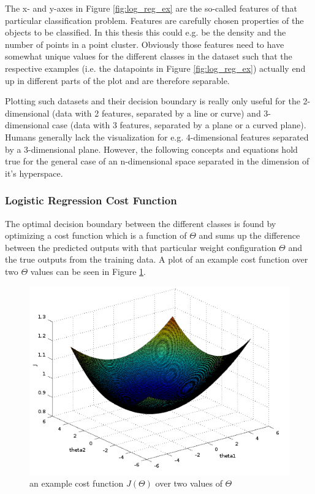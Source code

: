 The x- and y-axes in Figure \ref{fig:log_reg_ex} are the so-called features of that particular classification problem. Features are carefully chosen properties of the objects to be classified. In this thesis this could e.g. be the density and the number of points in a point cluster. Obviously those features need to have somewhat unique values for the different classes in the dataset such that the respective examples (i.e. the datapoints in Figure \ref{fig:log_reg_ex}) actually end up in different parts of the plot and are therefore separable.

Plotting such datasets and their decision boundary is really only useful for the 2-dimensional (data with 2 features, separated by a line or curve) and 3-dimensional case (data with 3 features, separated by a plane or a curved plane). Humans generally lack the visualization for e.g. 4-dimensional features separated by a 3-dimensional plane. However, the following concepts and equations hold true for the general case of an n-dimensional space separated in the dimension of it's hyperspace.

\subsubsection{Logistic Regression Cost Function}

The optimal decision boundary between the different classes is found by optimizing a cost function which is a function of $\Theta$ and sums up the difference between the predicted outputs with that particular weight configuration $\Theta$ and the true outputs from the training data. A plot of an example cost function over two $\Theta$ values can be seen in Figure \ref{fig:surf_cost_function}. 

\begin{figure}[H]
\centering
\includegraphics[width=0.8\linewidth]{include/images/surf_cost_function.png}
\caption{an example cost function $J(\Theta)$ over two values of $\Theta$}
\label{fig:surf_cost_function}
\end{figure}

